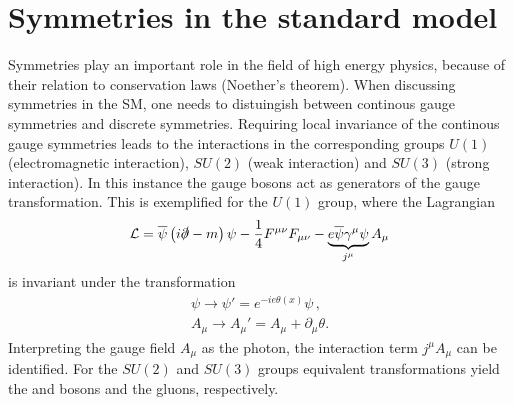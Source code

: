 \section{Symmetries in the standard model}
\label{sec:symmetriesInSM}

Symmetries play an important role in the field of high energy physics, \eg because of their relation to conservation laws (Noether's theorem).
When discussing symmetries in the \ac{SM}, one needs to distuingish between continous gauge symmetries and discrete symmetries.
Requiring local invariance of the continous gauge symmetries leads to the interactions in the corresponding groups $U(1)$ (electromagnetic interaction), $SU(2)$ (weak interaction) and $SU(3)$ (strong interaction).
In this instance the gauge bosons act as generators of the gauge transformation.
This is exemplified for the $U(1)$ group, where the Lagrangian
\begin{equation}
\mathcal{L}=\overline{\psi}\left(i\slashed{\partial} - m\right)\psi
- \frac{1}{4}F^{\mu\nu}F_{\mu\nu} - \underbrace{e\overline{\psi}\gamma^{\mu}\psi}_{j^{\mu}}A_{\mu}
\end{equation}
is invariant under the transformation
\begin{align}
\psi\rightarrow\psi'=e^{-ie\theta\left(x\right)}\psi\,,\\
A_\mu\rightarrow A_\mu'=A_\mu+\partial_\mu\theta.
\end{align}
Interpreting the gauge field $A_\mu$ as the photon, the interaction term $j^\mu A_\mu$ can be identified.
For the $SU(2)$ and $SU(3)$ groups equivalent transformations yield the \Wpm and \Z bosons and the gluons, respectively.

